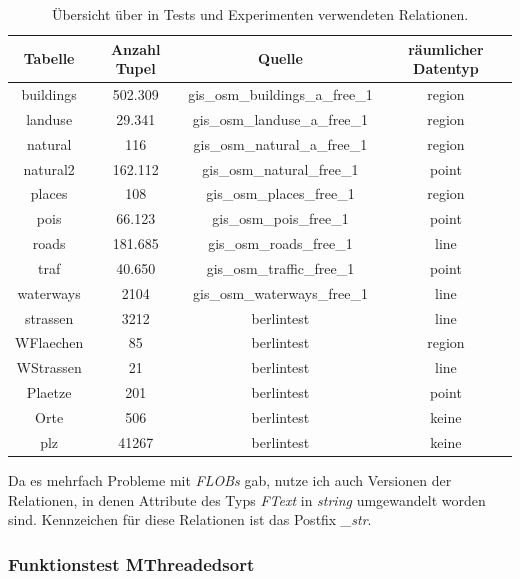 \documentclass[a4paper,12pt,twoside]{article}
\newcommand{\Fb}[1]{\textit{#1}} %
\begin{document}
{\begin{table}
	\centering
\begin{tabular}{|c|c|c|c|}
	\hline 
	Tabelle & Anzahl Tupel & Quelle & räumlicher Datentyp  \\ 
	\hline 
	buildings & 502.309 & gis\_osm\_buildings\_a\_free\_1 & region \\ 
	\hline 
	landuse & 29.341 & gis\_osm\_landuse\_a\_free\_1 & region \\ 
	\hline 
	natural & 116 & gis\_osm\_natural\_a\_free\_1 & region \\ 
	\hline 
	natural2 & 162.112 & gis\_osm\_natural\_free\_1 & point \\ 
	\hline
	places & 108 & gis\_osm\_places\_free\_1 & region \\ 
	\hline 
	pois & 66.123 & gis\_osm\_pois\_free\_1  & point \\ 
	\hline 
	roads & 181.685 & gis\_osm\_roads\_free\_1 & line \\ 
	\hline
	traf & 40.650 & gis\_osm\_traffic\_free\_1  & point \\ 
	\hline 
	waterways & 2104 & gis\_osm\_waterways\_free\_1 & line \\ 
	\hline
	strassen & 3212 &  berlintest & line \\ 
	\hline
	WFlaechen & 85 &  berlintest & region \\ 
	\hline 
	WStrassen & 21 &  berlintest & line \\ 
	\hline 
	Plaetze & 201 &  berlintest & point \\ 
	\hline 
	Orte & 506 & berlintest & keine \\ 
	\hline
	plz & 41267 & berlintest & keine \\ 
	\hline 
\end{tabular}
\caption{\label{tab:testRel} Übersicht über in Tests und Experimenten verwendeten Relationen.}
\end{table}

Da es mehrfach Probleme mit \Fb{FLOBs} gab, nutze ich auch Versionen der Relationen, in denen Attribute des Typs \Fb{FText} in \Fb{string} umgewandelt worden sind. Kennzeichen für diese Relationen ist das Postfix \Fb{\_str}.

\subsubsection{Funktionstest MThreadedsort}

}
\end{document}

